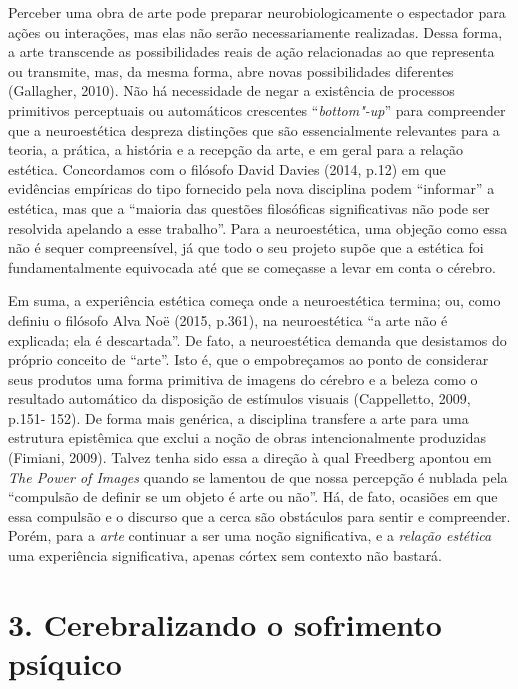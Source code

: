 Perceber uma obra de arte pode preparar neurobiologicamente o espectador
para ações ou interações, mas elas não serão necessariamente realizadas.
Dessa forma, a arte transcende as possibilidades reais de ação
relacionadas ao que representa ou transmite, mas, da mesma forma, abre
novas possibilidades diferentes (Gallagher, 2010). Não há necessidade de
negar a existência de processos primitivos perceptuais ou automáticos
crescentes ``\emph{bottom"-up}'' para compreender que a neuroestética
despreza distinções que são essencialmente relevantes para a teoria, a
prática, a história e a recepção da arte, e em geral para a relação
estética. Concordamos com o filósofo David Davies (2014, p.12) em que
evidências empíricas do tipo fornecido pela nova disciplina podem
``informar'' a estética, mas que a ``maioria das questões filosóficas
significativas não pode ser resolvida apelando a esse trabalho''. Para a
neuroestética, uma objeção como essa não é sequer compreensível, já que
todo o seu projeto supõe que a estética foi fundamentalmente equivocada
até que se começasse a levar em conta o cérebro.

Em suma, a experiência estética começa onde a neuroestética termina; ou,
como definiu o filósofo Alva Noë (2015, p.361), na neuroestética ``a
arte não é explicada; ela é descartada''. De fato, a neuroestética
demanda que desistamos do próprio conceito de ``arte''. Isto é, que o
empobreçamos ao ponto de considerar seus produtos uma forma primitiva de
imagens do cérebro e a beleza como o resultado automático da disposição
de estímulos visuais (Cappelletto, 2009, p.151- 152). De forma mais
genérica, a disciplina transfere a arte para uma estrutura epistêmica
que exclui a noção de obras intencionalmente produzidas (Fimiani, 2009).
Talvez tenha sido essa a direção à qual Freedberg apontou em \emph{The
Power of Images} quando se lamentou de que nossa percepção é nublada
pela ``compulsão de definir se um objeto é arte ou não''. Há, de fato,
ocasiões em que essa compulsão e o discurso que a cerca são obstáculos
para sentir e compreender. Porém, para a \emph{arte} continuar a ser uma
noção significativa, e a \emph{relação estética} uma experiência
significativa, apenas córtex sem contexto não bastará.

\part{3. Cerebralizando o sofrimento psíquico}

